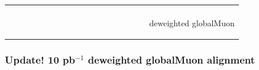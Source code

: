 \documentclass[compress]{beamer}
\begin{document}
\begin{frame}
\begin{center}
\begin{tabular}{p{0.4\linewidth} c p{0.4\linewidth}}
\begin{minipage}{\linewidth}
  \end{minipage} \\
  \begin{minipage}{\linewidth}
  \end{minipage} & &
  \begin{minipage}{\linewidth}
    \begin{center}
      deweighted globalMuon
    \end{center}
  \end{minipage}
\end{tabular}
\end{center}
\end{frame}

\begin{frame}
\frametitle{Update!  10 pb$^{-1}$ deweighted globalMuon alignment}


\end{frame}
\end{document}
